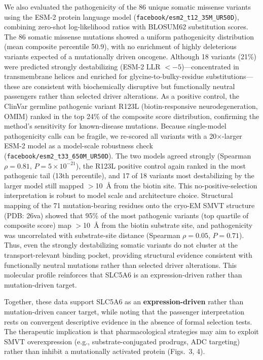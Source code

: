 \documentclass[10pt,letterpaper]{article}
\begin{document}
We also evaluated the pathogenicity of the 86 unique somatic missense variants using the ESM-2 protein language model (\nolinkurl{facebook/esm2_t12_35M_UR50D}), combining zero-shot log-likelihood ratios with BLOSUM62 substitution scores. The 86 somatic missense mutations showed a uniform pathogenicity distribution (mean composite percentile 50.9), with no enrichment of highly deleterious variants expected of a mutationally driven oncogene. Although 18 variants (21\%) were predicted strongly destabilizing (ESM-2 LLR $<-5$)---concentrated in transmembrane helices and enriched for glycine-to-bulky-residue substitutions---these are consistent with biochemically disruptive but functionally neutral passengers rather than selected driver alterations. As a positive control, the ClinVar germline pathogenic variant R123L (biotin-responsive neurodegeneration, OMIM) ranked in the top 24\% of the composite score distribution, confirming the method's sensitivity for known-disease mutations. Because single-model pathogenicity calls can be fragile, we re-scored all variants with a 20$\times$-larger ESM-2 model as a model-scale robustness check (\nolinkurl{facebook/esm2_t33_650M_UR50D}). The two models agreed strongly (Spearman $\rho=0.81$, $P=5\times10^{-21}$), the R123L positive control again ranked in the most pathogenic tail (13th percentile), and 17 of 18 variants most destabilizing by the larger model still mapped $>$10~\AA{} from the biotin site. This no-positive-selection interpretation is robust to model scale and architecture choice. Structural mapping of the 71 mutation-bearing residues onto the cryo-EM SMVT structure (PDB: 26va) showed that 95\% of the most pathogenic variants (top quartile of composite score) map $>$10~\AA{} from the biotin substrate site, and pathogenicity was uncorrelated with substrate-site distance (Spearman $\rho=0.05$, $P=0.71$). Thus, even the strongly destabilizing somatic variants do not cluster at the transport-relevant binding pocket, providing structural evidence consistent with functionally neutral mutations rather than selected driver alterations. This molecular profile reinforces that SLC5A6 is an expression-driven rather than mutation-driven target.

Together, these data support SLC5A6 as an \textbf{expression-driven} rather than mutation-driven cancer target, while noting that the passenger interpretation rests on convergent descriptive evidence in the absence of formal selection tests. The therapeutic implication is that pharmacological strategies may aim to exploit SMVT overexpression (e.g., substrate-conjugated prodrugs, ADC targeting) rather than inhibit a mutationally activated protein (Figs.~3, 4).
\end{document}
